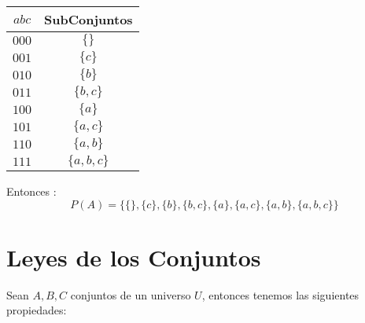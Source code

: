 \documentclass[12pt]{report}                                    %
\begin{document}
                \begin{tabular}{c | c  }
                   $a b c$ & SubConjuntos       \\
                   \midrule
                  
                   $0 0 0$ &  $\{ \}$           \\
                   $0 0 1$ &  $\{ c \}$         \\
                   $0 1 0$ &  $\{ b \}$         \\
                   $0 1 1$ &  $\{ b, c \}$      \\
                   $1 0 0$ &  $\{ a \}$         \\
                   $1 0 1$ &  $\{ a, c \}$      \\
                   $1 1 0$ &  $\{ a, b \}$      \\
                   $1 1 1$ &  $\{ a, b, c \}$   \\
                 
                \end{tabular}

                Entonces : 
                \begin{equation*}
                    P(A) = 
                    \{
                        \{ \}, \{ c \}, \{ b \}, \{ b, c \}, 
                        \{ a \}, \{ a, c \}, \{ a, b \}, \{ a, b, c \}
                    \}
                \end{equation*}



    \clearpage
    \section{Leyes de los Conjuntos}
            
        Sean $A, B, C$ conjuntos de un universo $U$, entonces tenemos las siguientes propiedades:
\end{document}
